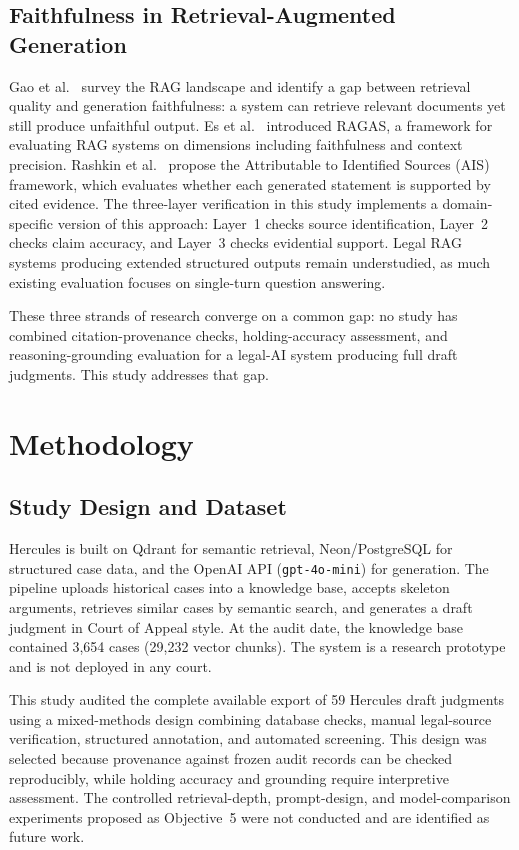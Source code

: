 \documentclass[conference]{IEEEtran}
\begin{document}
\subsection{Faithfulness in Retrieval-Augmented Generation}

Gao et al.~\cite{gao2024} survey the RAG landscape and identify a gap between retrieval quality and generation faithfulness: a system can retrieve relevant documents yet still produce unfaithful output. Es et al.~\cite{ragas2024} introduced RAGAS, a framework for evaluating RAG systems on dimensions including faithfulness and context precision. Rashkin et al.~\cite{rashkin2023} propose the Attributable to Identified Sources (AIS) framework, which evaluates whether each generated statement is supported by cited evidence. The three-layer verification in this study implements a domain-specific version of this approach: Layer~1 checks source identification, Layer~2 checks claim accuracy, and Layer~3 checks evidential support. Legal RAG systems producing extended structured outputs remain understudied, as much existing evaluation focuses on single-turn question answering.

These three strands of research converge on a common gap: no study has combined citation-provenance checks, holding-accuracy assessment, and reasoning-grounding evaluation for a legal-AI system producing full draft judgments. This study addresses that gap.

\section{Methodology}

\subsection{Study Design and Dataset}

Hercules is built on Qdrant for semantic retrieval, Neon/PostgreSQL for structured case data, and the OpenAI API (\texttt{gpt-4o-mini}) for generation. The pipeline uploads historical cases into a knowledge base, accepts skeleton arguments, retrieves similar cases by semantic search, and generates a draft judgment in Court of Appeal style. At the audit date, the knowledge base contained 3{,}654 cases (29{,}232 vector chunks). The system is a research prototype and is not deployed in any court.

This study audited the complete available export of 59 Hercules draft judgments using a mixed-methods design combining database checks, manual legal-source verification, structured annotation, and automated screening. This design was selected because provenance against frozen audit records can be checked reproducibly, while holding accuracy and grounding require interpretive assessment. The controlled retrieval-depth, prompt-design, and model-comparison experiments proposed as Objective~5 were not conducted and are identified as future work.
\end{document}
